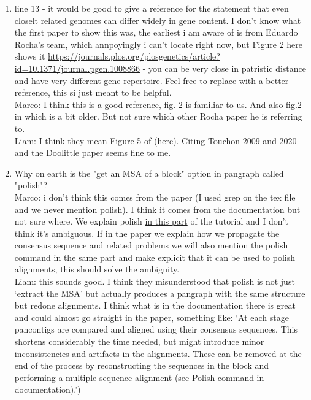 \documentclass[aps,rmp,onecolumn]{revtex4-1}
\newcommand{\Marco}[1]{{\color{gray}Marco: #1}}
\newcommand{\Liam}[1]{{\color{teal}Liam: #1}}
\begin{document}
\begin{enumerate}
      \item line 13 - it would be good to give a reference for the statement that even closelt related genomes can differ widely in gene content.
            I don't know what the first paper to show this was, the earliest i am aware of is from Eduardo Rocha's team, which annpoyingly i can't locate right now, but Figure 2 here shows it \url{https://journals.plos.org/plosgenetics/article?id=10.1371/journal.pgen.1008866} \cite{touchon2020phylogenetic} - you can be very close in patristic distance and have very different gene repertoire.
            Feel free to replace with a better reference, this si just meant to be helpful.\\
            \Marco{I think this is a good reference, fig. 2 is familiar to us. And also fig.2 in \cite{doolittle2009origin} which is a bit older. But not sure which other Rocha paper he is referring to.}\\
            \Liam{I think they mean Figure 5 of \cite{touchon2009organised} (\href{https://journals.plos.org/plosgenetics/article?id=10.1371/journal.pgen.1000344}{here}). Citing Touchon 2009 and 2020 and the Doolittle paper seems fine to me.}

      \item Why on earth is the "get an MSA of a block" option in pangraph called "polish"?\\
            \Marco{i don't think this comes from the paper (I used grep on the tex file and we never mention polish). I think it comes from the documentation but not sure where. We explain polish \href{https://neherlab.github.io/pangraph/tutorials/tutorial_3/\#Polishing-the-alignments}{in this part} of the tutorial and I don't think it's ambiguous. If in the paper we explain how we propagate the consensus sequence and related problems we will also mention the polish command in the same part and make explicit that it can be used to polish alignments, this should solve the ambiguity.}\\
            \Liam{this sounds good. I think they misunderstood that polish is not just `extract the MSA' but actually produces a pangraph with the same structure but redone alignments. I think what is in the documentation there is great and could almost go straight in the paper, something like: `At each stage pancontigs are compared and aligned using their consensus sequences. This shortens considerably the time needed, but might introduce minor inconsistencies and artifacts in the alignments. These can be removed at the end of the process by reconstructing the sequences in the block and performing a multiple sequence alignment (see Polish command in documentation).')}


\end{enumerate}
\end{document}
